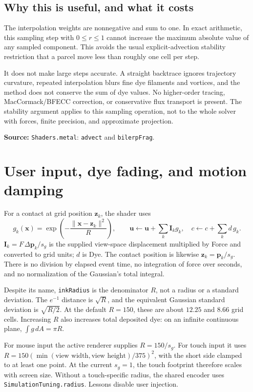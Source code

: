 \documentclass[11pt,a4paper]{article}
\newcommand{\uvec}{\mathbf{u}}
\newcommand{\xvec}{\mathbf{x}}
\newcommand{\src}[1]{\par{\footnotesize\raggedright\color{teal}\textbf{Source:} #1\par}}
\newcommand{\code}[1]{\texttt{#1}}
\newcommand{\page}[1]{\clearpage\section{#1}}
\begin{document}
\subsection*{Why this is useful, and what it costs}
The interpolation weights are nonnegative and sum to one. In exact arithmetic,
this sampling step with $0\leq r\leq1$ cannot increase the maximum absolute
value of any sampled component. This avoids the usual explicit-advection stability
restriction that a parcel move less than roughly one cell per step.

It does not make large steps accurate. A straight backtrace ignores trajectory
curvature, repeated interpolation blurs fine dye filaments and vortices, and the
method does not conserve the sum of dye values. No higher-order tracing,
MacCormack/BFECC correction, or conservative flux transport is present.
The stability argument applies to this sampling operation, not to the whole
solver with forces, finite precision, and approximate projection.
\src{\code{Shaders.metal}: \code{advect} and \code{bilerpFrag}.}

\page{User input, dye fading, and motion damping}
For a contact at grid position $\mathbf z_k$, the shader uses
\begin{equation}
 g_k(\xvec)=\exp\!\left(-\frac{\|\xvec-\mathbf z_k\|^2}{R}\right),\qquad
 \uvec\leftarrow\uvec+\sum_k\mathbf I_k g_k,\quad
 c\leftarrow c+\sum_k d\,g_k.\label{eq:splat}
\end{equation}
$\mathbf I_k=F\,\Delta\mathbf p_k/s_g$ is the supplied view-space displacement
multiplied by Force and converted to grid units; $d$ is Dye. The contact position
is likewise $\mathbf z_k=\mathbf p_k/s_g$. There is no division by elapsed event time, no integration
of force over seconds, and no normalization of the Gaussian's total integral.

Despite its name, \code{inkRadius} is the denominator $R$, not a radius or a
standard deviation. The $e^{-1}$ distance is $\sqrt R$, and the equivalent
Gaussian standard deviation is $\sqrt{R/2}$. At the default $R=150$, these are
about $12.25$ and $8.66$ grid cells. Increasing $R$ also increases total deposited
dye: on an infinite continuous plane, $\int g\,dA=\pi R$.

For mouse input the active renderer supplies $R=150/s_g$. For touch input it
uses $R=150(\min(\text{view width},\text{view height})/375)^2$, with the short
side clamped to at least one point. At the current $s_g=1$, the touch footprint
therefore scales with screen size. Without a touch-specific radius, the shared encoder uses \code{SimulationTuning.radius}. Lessons disable user injection.
\end{document}
